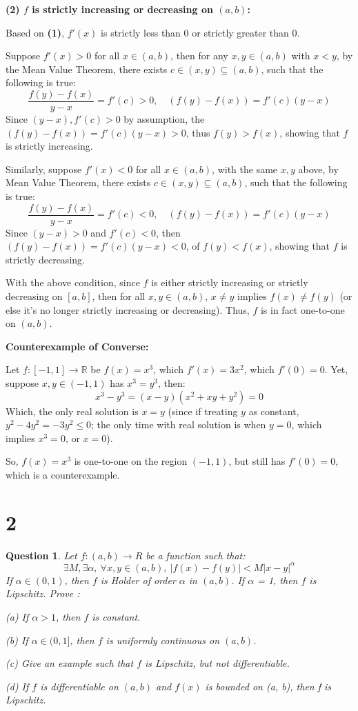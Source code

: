 \documentclass{article}
\newtheorem{question}{Question}
\begin{document}
\textbf{(2) $f$ is strictly increasing or decreasing on $(a,b)$:}

Based on \textbf{(1)}, $f'(x)$ is strictly less than $0$ or strictly greater than $0$.

Suppose $f'(x)>0$ for all $x\in(a,b)$, then for any $x,y\in (a,b)$ with $x<y$, by the Mean Value Theorem, 
there exists $c\in (x,y)\subseteq (a,b)$, such that the following is true:
$$\frac{f(y)-f(x)}{y-x}=f'(c) >0,\quad (f(y)-f(x))=f'(c)(y-x)$$
Since $(y-x), f'(c)>0$ by assumption, the $(f(y)-f(x))=f'(c)(y-x)>0$, thus $f(y)>f(x)$, showing that $f$ is strictly increasing.

Similarly, suppose $f'(x)<0$ for all $x\in (a,b)$, with the same $x,y$ above, by Mean Value Theorem, there exists $c\in(x,y)\subseteq (a,b)$,
such that the following is true:
$$\frac{f(y)-f(x)}{y-x}=f'(c) <0,\quad (f(y)-f(x))=f'(c)(y-x)$$
Since $(y-x)>0$ and $f'(c)<0$, then $(f(y)-f(x))=f'(c)(y-x)<0$, of $f(y)<f(x)$, showing that $f$ is strictly decreasing.

\hfill

With the above condition, since $f$ is either strictly increasing or strictly decreasing on $[a,b]$, 
then for all $x,y\in(a,b)$, $x\neq y$ implies $f(x)\neq f(y)$ (or else it's no longer strictly increasing or decreasing).
Thus, $f$ is in fact one-to-one on $(a,b)$.

\hfill

\textbf{Counterexample of Converse:}

Let $f:[-1,1]\rightarrow \mathbb{R}$ be $f(x)=x^3$, which $f'(x)=3x^2$, which $f'(0)=0$. 
Yet, suppose $x,y\in (-1,1)$ has $x^3=y^3$, then:
$$x^3-y^3=(x-y)(x^2+xy+y^2)=0$$
Which, the only real solution is $x=y$ (since if treating $y$ as constant, $y^2-4y^2=-3y^2\leq 0$; the only time with real solution is when $y=0$, which implies $x^3=0$, or $x=0$).

So, $f(x)=x^3$ is one-to-one on the region $(-1,1)$, but still has $f'(0)=0$, which is a counterexample.

\break

\section*{2}
\begin{question}
    Let $f : (a, b) \rightarrow R$ be a function such that:
    $$\exists M,\exists\alpha,\ \forall x,y\in(a,b),\ |f(x)-f(y)|<M|x-y|^\alpha$$
    If $\alpha\in(0,1)$, then $f$ is Holder of order $\alpha$ in $(a, b)$. If $\alpha$ = 1, then $f$ is Lipschitz.
    Prove :

    (a) If $\alpha>1$, then $f$ is constant.

    (b) If $\alpha\in(0,1]$, then $f$ is uniformly continuous on $(a, b)$.

    (c) Give an example such that $f$ is Lipschitz, but not differentiable.

    (d) If $f$ is differentiable on $(a, b)$ and $f(x)$ is bounded on (a, b), then f is Lipschitz.
\end{question}
\end{document}
